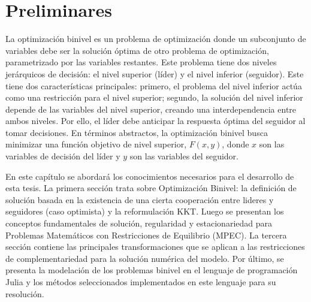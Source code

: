 \chapter{Preliminares}\label{chapter:state-of-the-art}

La optimización binivel es un problema de optimización donde un subconjunto de variables debe ser la solución óptima de otro problema de optimización, parametrizado por las variables restantes. Este problema tiene dos niveles jerárquicos de decisión: el nivel superior (líder) y el nivel inferior (seguidor).
Este tiene dos características principales: primero, el problema del nivel inferior actúa como una restricción para el nivel superior; segundo, la solución del nivel inferior depende de las variables del nivel superior, creando una interdependencia entre ambos niveles. Por ello, el líder debe anticipar la respuesta óptima del seguidor al tomar decisiones.
En términos abstractos, la optimización binivel busca minimizar una función objetivo de nivel superior, $F(x, y)$, donde $x$ son las variables de decisión del líder y $y$ son las variables del seguidor. 

En este capítulo se abordará los conocimientos necesarios para el desarrollo de esta tesis. La primera sección trata  sobre Optimización Binivel: la definición de solución basada en la existencia de una cierta cooperación entre lideres y seguidores (caso  optimista) y la reformulación KKT. Luego se presentan los conceptos fundamentales  de solución, regularidad y estacionariedad para Problemas Matemáticos con Restricciones de Equilibrio (MPEC). La tercera sección contiene las principales transformaciones que se aplican a las restricciones de complementariedad para la solución numérica del modelo. Por último, se presenta la modelación de los problemas binivel en el lenguaje de programación Julia y los métodos seleccionados implementados en este lenguaje para su resolución. 

